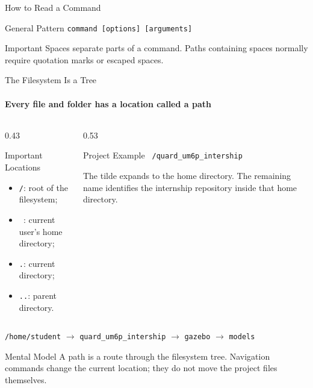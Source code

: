\begin{frame}{How to Read a Command}
\pause

\begin{exampleblock}{General Pattern}
\centering
\texttt{command [options] [arguments]}
\end{exampleblock}

\begin{alertblock}{Important}
Spaces separate parts of a command. Paths containing spaces normally require
quotation marks or escaped spaces.
\end{alertblock}
\end{frame}

\begin{frame}{The Filesystem Is a Tree}
\framesubtitle{Every file and folder has a location called a path}

\footnotesize

\begin{columns}[T,onlytextwidth]
    \begin{column}{0.43\textwidth}
        \begin{block}{Important Locations}
            \begin{itemize}
                \setlength{\itemsep}{0.22em}
                \item \texttt{/}: root of the filesystem;
                \item \texttt{~}: current user's home directory;
                \item \texttt{.}: current directory;
                \item \texttt{..}: parent directory.
            \end{itemize}
        \end{block}
    \end{column}

    \begin{column}{0.53\textwidth}
        \begin{exampleblock}{Project Example}
            \texttt{~/quard\_um6p\_intership}

            \vspace{0.12cm}
            The tilde expands to the home directory. The remaining
            name identifies the internship repository inside that home directory.
        \end{exampleblock}
    \end{column}
\end{columns}

\pause

\begin{center}
\texttt{/home/student}
$\longrightarrow$
\texttt{quard\_um6p\_intership}
$\longrightarrow$
\texttt{gazebo}
$\longrightarrow$
\texttt{models}
\end{center}

\begin{alertblock}{Mental Model}
A path is a route through the filesystem tree. Navigation commands change the
current location; they do not move the project files themselves.
\end{alertblock}
\end{frame}

